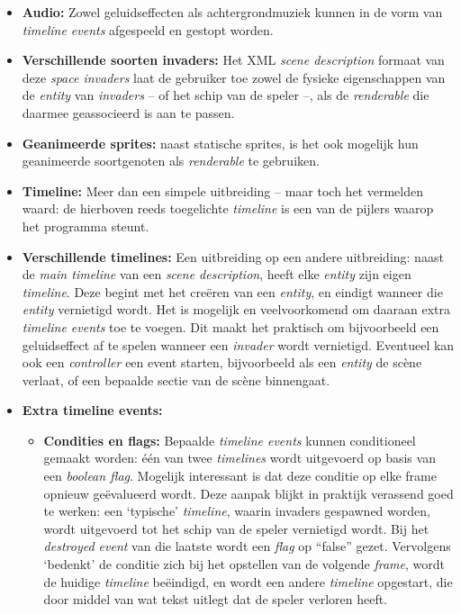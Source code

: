 \documentclass[10pt,a4paper]{article}
\begin{document}
\begin{itemize}

\item \textbf{Audio:} Zowel geluidseffecten als achtergrondmuziek kunnen 
in de vorm van \emph{timeline events} afgespeeld en gestopt worden.

\item \textbf{Verschillende soorten invaders:} Het XML 
\emph{scene description} formaat van deze \emph{space invaders} laat
de gebruiker toe zowel de fysieke eigenschappen van de 
\emph{entity} van \emph{invaders} -- of het schip van de speler --, 
als de \emph{renderable} die daarmee geassocieerd is
aan te passen.

\item \textbf{Geanimeerde sprites:} naast statische sprites, is het
ook mogelijk hun geanimeerde soortgenoten als \emph{renderable} te 
gebruiken.

\item \textbf{Timeline:} Meer dan een simpele uitbreiding -- 
maar toch het vermelden waard: de hierboven
reeds toegelichte \emph{timeline} is een van de pijlers waarop het programma
steunt.

\item \textbf{Verschillende timelines:} Een uitbreiding op een 
andere uitbreiding: naast de \emph{main timeline} van een 
\emph{scene description}, heeft elke \emph{entity} zijn eigen 
\emph{timeline}. Deze begint met het cre\"eren van een \emph{entity}, 
en eindigt wanneer die \emph{entity} vernietigd wordt. Het is mogelijk
en veelvoorkomend om daaraan extra \emph{timeline events} toe te voegen.
Dit maakt het praktisch om bijvoorbeeld een geluidseffect af te spelen
wanneer een \emph{invader} wordt vernietigd. Eventueel kan ook een 
\emph{controller} een event starten, bijvoorbeeld als een \emph{entity}
de sc\`ene verlaat, of een bepaalde sectie van de sc\`ene binnengaat.

\item \textbf{Extra timeline events:}
\begin{itemize}
	
\item \textbf{Condities en flags:} Bepaalde \emph{timeline events} kunnen
conditioneel gemaakt worden: \'e\'en van twee \emph{timelines} wordt 
uitgevoerd op basis van een \emph{boolean flag}. 
Mogelijk interessant is dat deze conditie op elke frame 
opnieuw ge\"evalueerd wordt. Deze aanpak blijkt in praktijk 
verassend goed te werken: een `typische' \emph{timeline}, waarin
invaders gespawned worden, wordt uitgevoerd tot het schip van de speler
vernietigd wordt. Bij het \emph{destroyed event} van die laatste 
wordt een \emph{flag} op ``false'' gezet. Vervolgens `bedenkt' de conditie 
zich bij het opstellen van
de volgende \emph{frame}, wordt de huidige 
\emph{timeline} be\"eindigd, en wordt een andere \emph{timeline} opgestart,
die door middel van wat tekst uitlegt dat de speler verloren heeft.


\end{itemize}
\end{itemize}
\end{document}

